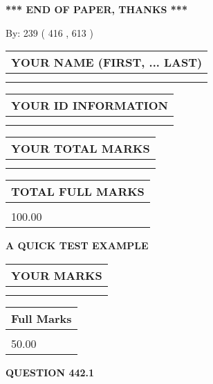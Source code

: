\documentclass[12pt]{article}
\begin{document}
\vspace{1.0in} 
{\textbf{\large{ *** END OF PAPER, THANKS *** }}} 
   
   
\hspace{1.0in} By: 
 239 ( 416 ,  613 )
   
   
   
   
\newpage 
\setcounter{page}{ 
   442001 } 
   
   
   
   
\noindent\begin{tabular}{|l|}
\hline
YOUR NAME (FIRST, ... LAST)  \\
\hline
 \\ 
 \\ 
\hline
\end{tabular}
\hspace{0.05in} \begin{tabular}{|l|}
\hline
 YOUR   ID   INFORMATION  \\
\hline
 \\ 
 \\ 
\hline
\end{tabular}
   
   
\vspace{0.2in}\noindent\begin{tabular}{|l|}
\hline
YOUR TOTAL MARKS  \\
\hline
 \\ 
 \\ 
\hline
\end{tabular}
\hspace{0.05in} \begin{tabular}{|l|}
\hline
TOTAL FULL MARKS  \\
\hline
 \\ 
100.00 \\
\hline
\end{tabular}
   
   
 \vspace{0.2in}
{\LARGE {\textbf{ A QUICK TEST EXAMPLE}}}
   
   
  
\vspace{0.2in}
  
\noindent\begin{tabular}{|l|}
\hline
 YOUR MARKS  \\
\hline
 \\ 
 \\ 
\hline
\end{tabular}
\hspace{0.05in} \begin{tabular}{|l|}
\hline
 Full Marks  \\
\hline
 \\ 
50.00 \\
\hline
\end{tabular}
{\textbf{\Large{QUESTION
442.1 
}}}
  
\end{document}
